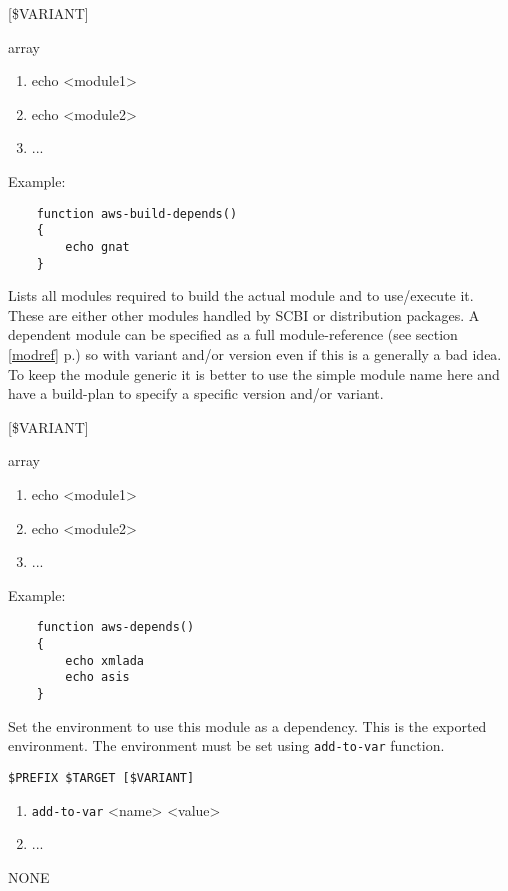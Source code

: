 \documentclass[a4paper,12pt,twoside]{article}
\newcommand{\code}[1]{\texttt{#1}}
\newcommand{\seeref}[1]{see section \ref{#1} p.\pageref{#1}}
\begin{document}
\begin{description}[font=\large\texttt]
	\begin{description}[font=\textit,style=standard]
		\item[parameter] \tabto{2cm} [\$VARIANT]
		\item[return] \tabto{2cm} array
		\begin{enumerate}
			\item echo <module1>
			\item echo <module2>
			\item ...
		\end{enumerate}
	\end{description}

	Example:
	\begin{lstlisting}
	function aws-build-depends()
	{
		echo gnat
	}
	\end{lstlisting}

	\item[<module>-depends] Lists all modules required to build the actual module and to use/execute it. These are either other modules handled by SCBI or distribution packages. A dependent module can be specified as a full module-reference (\seeref{modref}) so with variant and/or version even if this is a generally a bad idea. To keep the module generic it is better to use the simple module name here and have a build-plan to specify a specific version and/or variant.

	\begin{description}[font=\textit,style=standard]
		\item[parameter] \tabto{2cm} [\$VARIANT]
		\item[return] \tabto{2cm} array
		\begin{enumerate}
			\item echo <module1>
			\item echo <module2>
			\item ...
		\end{enumerate}
	\end{description}

	Example:
	\begin{lstlisting}
	function aws-depends()
	{
		echo xmlada
		echo asis
	}
	\end{lstlisting}

	\item[<module>-env] Set the environment to use this module as a dependency. This is the exported environment. The environment must be set using \code{add-to-var} function.
	\begin{description}[font=\textit,style=standard]
		\item[parameter] \tabto{2cm} \code{\$PREFIX \$TARGET [\$VARIANT]}
		\begin{enumerate}
			\item \code{add-to-var} <name> <value>
			\item ...
		\end{enumerate}
		\item[return] \tabto{2cm} NONE
	\end{description}


\end{description}
\end{document}
